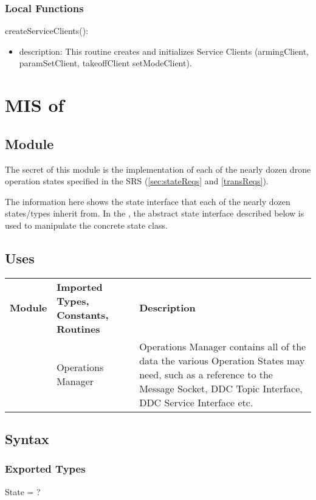 \documentclass[12pt, titlepage]{article}
\begin{document}
\subsubsection{Local Functions}
\noindent createServiceClients():
\begin{itemize}
\item description: This routine creates and initializes Service Clients (armingClient, paramSetClient, takeoffClient setModeClient). 
\end{itemize}
\newpage






\section{MIS of } \label{MIS_OPERATION_STATE} 
\subsection{Module}
The secret of this module is the implementation of each of the nearly dozen drone operation states specified in the SRS (\ref{sec:stateReqs} and \ref{transReqs}). 

The information here shows the state interface that each of the nearly dozen states/types inherit from. In the , the abstract state interface described below is used to manipulate the concrete state class.
\subsection{Uses}
\begin{center}
\begin{tabular}{p{2 cm} p{5cm} p{6.5cm} } 
\hline
\textbf{Module} & \textbf{Imported Types, Constants, Routines} & \textbf{Description} \\
\nameref{Operations Manager} & Operations Manager & Operations Manager contains all of the data the various Operation States may need, such as a reference to the Message Socket, DDC Topic Interface, DDC Service Interface etc. \\
\hline
\hline
\end{tabular}
\end{center}
\subsection{Syntax}
\subsubsection{Exported Types}
State = ?
\end{document}
